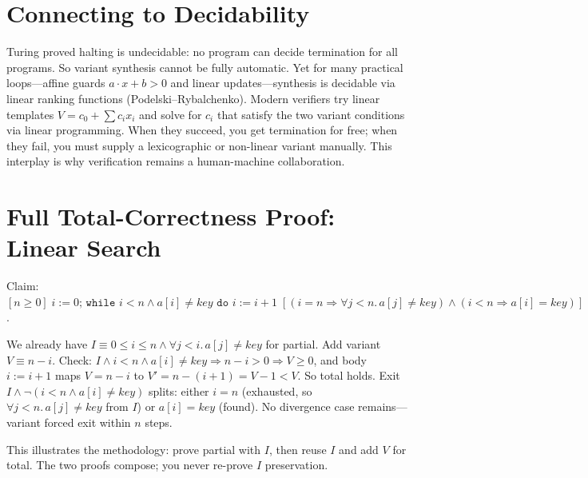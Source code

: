 \section{Connecting to Decidability}
\label{sec:decidability}
Turing proved halting is undecidable: no program can decide termination for all programs. So variant synthesis cannot be fully automatic. Yet for many practical loops—affine guards $a\cdot x + b > 0$ and linear updates—synthesis is decidable via linear ranking functions (Podelski--Rybalchenko). Modern verifiers try linear templates $V = c_0 + \sum c_i x_i$ and solve for $c_i$ that satisfy the two variant conditions via linear programming. When they succeed, you get termination for free; when they fail, you must supply a lexicographic or non-linear variant manually. This interplay is why verification remains a human-machine collaboration.

\section{Full Total-Correctness Proof: Linear Search}
\label{sec:search-total}
Claim: $[n\ge0]\; i:=0;\,\texttt{while }i<n\land a[i]\neq key\texttt{ do }i:=i+1\; [ (i=n\Rightarrow\forall j<n.\,a[j]\neq key)\land(i<n\Rightarrow a[i]=key)]$.

We already have $I\equiv 0\le i\le n\land\forall j<i.\,a[j]\neq key$ for partial. Add variant $V\equiv n-i$. Check: $I\land i<n\land a[i]\neq key\Rightarrow n-i>0\Rightarrow V\ge0$, and body $i:=i+1$ maps $V=n-i$ to $V'=n-(i+1)=V-1<V$. So total holds. Exit $I\land\neg(i<n\land a[i]\neq key)$ splits: either $i=n$ (exhausted, so $\forall j<n.\,a[j]\neq key$ from $I$) or $a[i]=key$ (found). No divergence case remains—variant forced exit within $n$ steps.

This illustrates the methodology: prove partial with $I$, then reuse $I$ and add $V$ for total. The two proofs compose; you never re-prove $I$ preservation.

